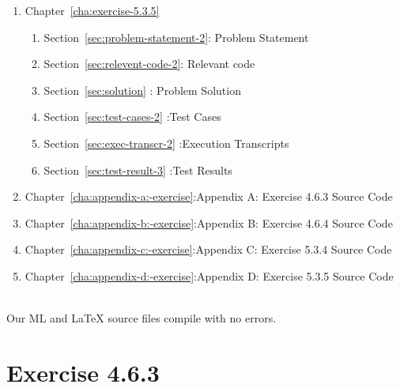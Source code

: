\documentclass{report}
\begin{document}
\begin{description}
\begin{enumerate}[{}]
  \item Chapter~\ref{cha:exercise-5.3.5}
   \begin{enumerate}[{}]
   \item Section~\ref{sec:problem-statement-2}: Problem Statement
    \item Section~\ref{sec:relevent-code-2}: Relevant code
   \item Section~\ref{sec:solution} : Problem Solution
    \item Section~\ref{sec:test-cases-2} :Test Cases
    \item Section~\ref{sec:exec-transcr-2} :Execution Transcripts
    \item Section~\ref{sec:test-result-3} :Test Results
   \end{enumerate}
 \item Chapter~\ref{cha:appendix-a:-exercise}:Appendix A: Exercise 4.6.3 Source Code
  \item Chapter~\ref{cha:appendix-b:-exercise}:Appendix B: Exercise 4.6.4 Source Code
  \item Chapter~\ref{cha:appendix-c:-exercise}:Appendix C: Exercise 5.3.4 Source Code
  \item Chapter~\ref{cha:appendix-d:-exercise}:Appendix D: Exercise 5.3.5 Source Code
  \end{enumerate}
\item[Reproducibility in ML and \LaTeX{}] \ \\
  Our ML and \LaTeX{} source files compile with no errors.
\end{description}



\chapter{Exercise 4.6.3}
\label{cha:exercise-4.6.3}
\end{document}
